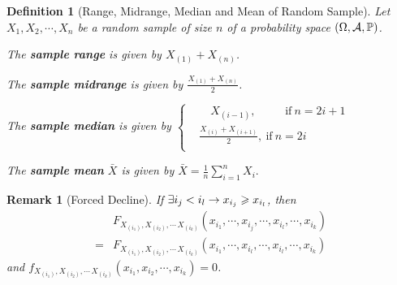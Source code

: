 \documentclass[openany,12pt]{book}
\newtheorem{remark}{Remark}[chapter]
\newtheorem{definition}{Definition}[chapter]
\begin{document}
\begin{definition}[Range, Midrange, Median and Mean of Random Sample]
  Let $X_{1}, X_{2}, \cdots,X_{n}$ be a random sample of size $n$ of
  a probability space $(\Omega,\mathcal{A},\mathbb{P})$.

  The \textbf{sample range} is given by
  $X_{\left( 1 \right)} + X_{\left( n \right)}$.

  The \textbf{sample midrange} is given by
  $\frac{X_{\left( 1 \right)} + X_{\left( n \right)}}{2}$.

  The \textbf{sample median} is given by $\left\{ \begin{aligned}
       & \quad X_{\left( i - 1 \right)},\qquad~\text{ if}~ n = 2i + 1                  \\
       & \frac{X_{\left( i \right)} + X_{\left( i + 1 \right)}}{2}, ~\text{if}~ n = 2i \\
    \end{aligned} \right.$

  The \textbf{sample mean} $\bar{X}$ is given by $\bar{X} = \frac{1}{n}\sum_{i = 1}^{n}X_{i}.$
\end{definition}

\begin{remark}[Forced Decline]
  If $\exists i_{j} < i_{l} \to x_{i_{j}} \geqslant x_{i_{l}}$, then
  \[\begin{aligned}
        & F_{X_{(i_{1})},X_{(i_{2})},\cdots\,X_{(i_{k})}}\left( x_{i_{1}}, \cdots,x_{i_{j}}, \cdots,x_{i_{l}}, \cdots, x_{i_{k}} \right) \\
      = & F_{X_{(i_{1})},X_{(i_{2})},\cdots\,X_{(i_{k})}}\left( x_{i_{1}}, \cdots,x_{i_{l}}, \cdots,x_{i_{l}}, \cdots, x_{i_{k}} \right)\end{aligned}\]
  and
  $f_{X_{(i_{1})},X_{(i_{2})},\cdots\,X_{(i_{k})}}\left( x_{i_{1}},x_{i_{2}}, \cdots, x_{i_{k}} \right)= 0$.
\end{remark}
\end{document}
